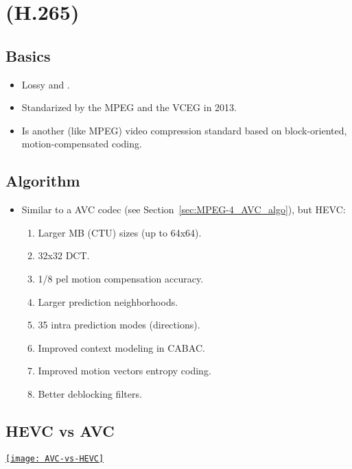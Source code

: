 \chapter{ (H.265)}
\label{cha:HEVC}

\section{Basics}
\begin{itemize}
\item Lossy and .
\item Standarized by the \gls{MPEG} and the \gls{VCEG} in 2013.
\item Is another (like \gls{MPEG}) video compression standard based on
  block-oriented, motion-compensated coding.
\end{itemize}

\section{Algorithm}
\label{sec:HEVC_algo}
\begin{itemize}
\item Similar to a \gls{AVC} codec (see Section~\ref{sec:MPEG-4_AVC_algo}),
  but \gls{HEVC}:
\begin{enumerate}
\item Larger MB (\gls{CTU}) sizes (up to 64x64).
\item 32x32 \gls{DCT}.
\item 1/8 pel motion compensation accuracy.
\item Larger prediction neighborhoods.
\item 35 intra prediction modes (directions).
\item Improved context modeling in \gls{CABAC}.
\item Improved motion vectors entropy coding.
\item Better deblocking filters.
\end{enumerate}
\end{itemize}

\section{HEVC vs AVC}
\begin{center}
  \href{https://www.epiphan.com/blog/h264-vs-h265/}{\texttt{[image: AVC-vs-HEVC]}}
\end{center}
